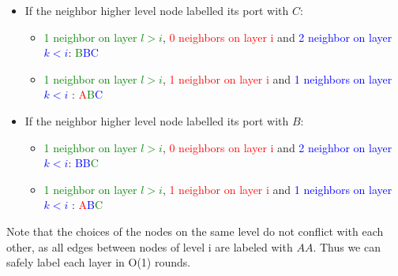 \begin{itemize}
    \item If the neighbor higher level node labelled its port with $C$:
    \begin{itemize}
        \item \textcolor{green}{1 neighbor on layer $l>i$}, \textcolor{red}{0 neighbors on layer i} and \textcolor{blue}{2 neighbor on layer $k<i$}: \textcolor{green}{B}\textcolor{blue}{BC}
        \item \textcolor{green}{1 neighbor on layer $l>i$}, \textcolor{red}{1 neighbor on layer i} and \textcolor{blue}{1 neighbors on layer $k<i$} : \textcolor{red}{A}\textcolor{green}{B}\textcolor{blue}{C}
    \end{itemize}
    
    \item If the neighbor higher level node labelled its port with $B$:
    \begin{itemize}
        \item \textcolor{green}{1 neighbor on layer $l>i$}, \textcolor{red}{0 neighbors on layer i} and \textcolor{blue}{2 neighbor on layer $k<i$}: \textcolor{blue}{BB}\textcolor{green}{C}
        \item \textcolor{green}{1 neighbor on layer $l>i$}, \textcolor{red}{1 neighbor on layer i} and \textcolor{blue}{1 neighbors on layer $k<i$} : \textcolor{red}{A}\textcolor{blue}{B}\textcolor{green}{C}
    \end{itemize}
\end{itemize}
Note that the choices of the nodes on the same level do not conflict with each other, as all edges between nodes of level i are labeled with $AA$. Thus we can safely label each layer in O(1) rounds.